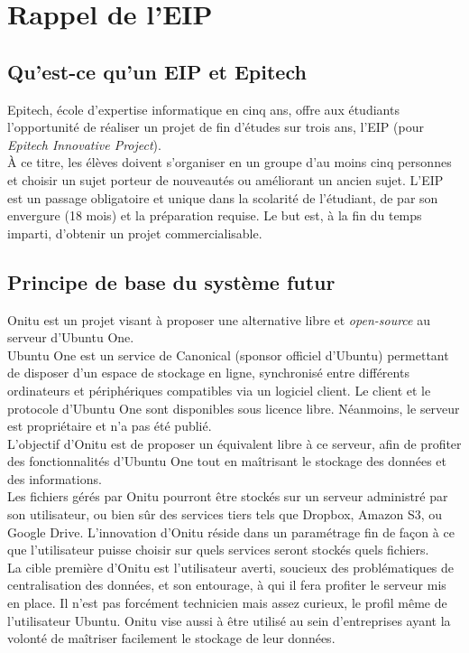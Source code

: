 \section{Rappel de l'EIP}

\subsection{Qu'est-ce qu'un EIP et Epitech}
Epitech, école d'expertise informatique en cinq ans, offre aux étudiants l'opportunité de réaliser un projet de fin d'études sur trois ans, l'EIP (pour \emph{Epitech Innovative Project}).\\

À ce titre, les élèves doivent s'organiser en un groupe d'au moins cinq personnes et choisir un sujet porteur de nouveautés ou améliorant un ancien sujet. L'EIP est un passage obligatoire et unique dans la scolarité de l'étudiant, de par son envergure (18 mois) et la préparation requise. Le but est, à la fin du temps imparti, d'obtenir un projet commercialisable.


\subsection{Principe de base du système futur}
    Onitu est un projet visant à proposer une alternative libre et \emph{open-source} au serveur d’Ubuntu One.\\

    Ubuntu One est un service de Canonical (sponsor officiel d'Ubuntu) permettant de disposer d’un espace de stockage en ligne, synchronisé entre différents ordinateurs et périphériques compatibles via un logiciel client. Le client et le protocole d’Ubuntu One sont disponibles sous licence libre. Néanmoins, le serveur est propriétaire et n’a pas été publié.\\

    L'objectif d'Onitu est de proposer un équivalent libre à ce serveur, afin de profiter des fonctionnalités d’Ubuntu One tout en maîtrisant le stockage des données et des informations.\\

    Les fichiers gérés par Onitu pourront être stockés sur un serveur administré par son utilisateur, ou bien sûr des services tiers tels que Dropbox, Amazon S3, ou Google Drive. L'innovation d'Onitu réside dans un paramétrage fin de façon à ce que l'utilisateur puisse choisir sur quels services seront stockés quels fichiers.\\

    La cible première d'Onitu est l'utilisateur averti, soucieux des problématiques de centralisation des données, et son entourage, à qui il fera profiter le serveur mis en place. Il n'est pas forcément technicien mais assez curieux, le profil même de l'utilisateur Ubuntu.
    Onitu vise aussi à être utilisé au sein d'entreprises ayant la volonté de maîtriser facilement le stockage de leur données.\\

